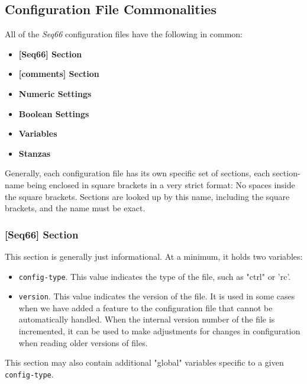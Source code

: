 \subsection{Configuration File Commonalities}
\label{subsec:configuration_file_commonalities}

   All of the \textsl{Seq66} configuration files have the following in common:

   \begin{itemize}
      \item \textbf{[Seq66] Section}
      \item \textbf{[comments] Section}
      \item \textbf{Numeric Settings}
      \item \textbf{Boolean Settings}
      \item \textbf{Variables}
      \item \textbf{Stanzas}
   \end{itemize}

   Generally, each configuration file has its own specific set
   of sections, each section-name being enclosed in square brackets in a very
   strict format:  No spaces inside the square brackets.  Sections are looked up
   by this name, including the square brackets, and the name must be exact.

\subsubsection{[Seq66] Section}
\label{subsec:configuration_common_seq66_section}

   This section is generally just informational.  At a minimum, it holds two
   variables:

   \begin{itemize}
      \item \texttt{config-type}.  This value indicates the type of the file,
      such as "ctrl" or 'rc'.
      \item \texttt{version}.  This value indicates the version of the file.
      It is used in some cases when we have added a feature to the
      configuration file that cannot be automatically handled.
      When the internal version number of the file is incremented,
      it can be used to make adjustments for changes in configuration when
      reading older versions of files.
   \end{itemize}

   This section may also contain additional "global"
   variables specific to a given \texttt{config-type}.

